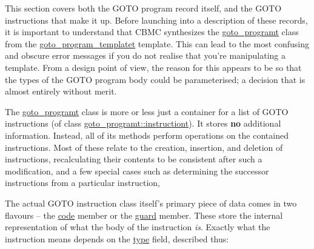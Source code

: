 \documentclass{article}
\begin{document}
This section covers both the GOTO program record itself, and the GOTO
instructions that make it up. Before launching into a description of these
records, it is important to understand that CBMC synthesizes the
\url{goto_programt} class from the \url{goto_program_templatet}
template. This can lead to the most confusing and obscure error messages
if you do not realise that you're manipulating a template. From a design
point of view, the reason for this appears to be so that the types of
the GOTO program body could be parameterised; a decision that is almost
entirely without merit.

The \url{goto_programt} class is more or less just a container for a
list of GOTO instructions (of class \url{goto_programt::instructiont}).
It stores \textbf{no} additional information. Instead, all of its methods
perform operations on the contained instructions. Most of these relate
to the creation, insertion, and deletion of instructions, recalculating
their contents to be consistent after such a modification, and a few
special cases such as determining the successor instructions from a
particular instruction,

The actual GOTO instruction class itself's primary piece of data comes in
two flavours -- the \url{code} member or the \url{guard} member.
These store the internal representation of what the body of the instruction
\textit{is}. Exactly what the instruction means depends on the \url{type}
field, described thus:
\end{document}
